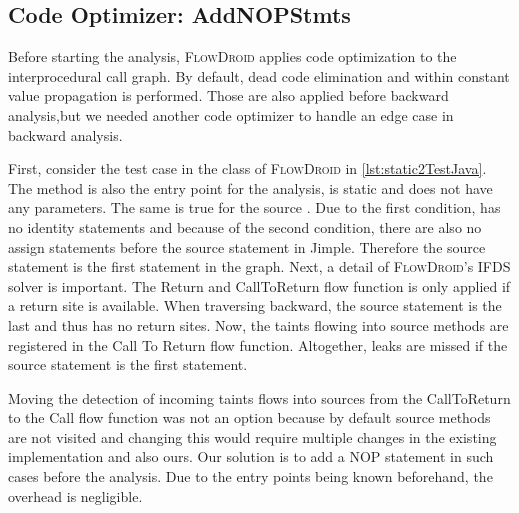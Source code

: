 \documentclass[../draft.tex]{subfiles}
\begin{document}
    \subsection{Code Optimizer: AddNOPStmts}
    Before starting the analysis, \textsc{FlowDroid} applies code optimization to the interprocedural call graph. 
    By default, dead code elimination and within constant value propagation is performed. 
    Those are also applied before backward analysis,but we needed another code optimizer to handle an edge case in backward analysis.

    First, consider the  test case in the  class of \textsc{FlowDroid} in \autoref{lst:static2TestJava}. 
    The method is also the entry point for the analysis, is static and does not have any parameters. 
    The same is true for the source . 
    Due to the first condition,  has no identity statements and because of the second condition, there are also no assign statements before the source statement in Jimple. 
    Therefore the source statement is the first statement in the graph. 
    Next, a detail of \textsc{FlowDroid}'s IFDS solver is important. 
    The Return and CallToReturn flow function is only applied if a return site is available.
    When traversing backward, the source statement is the last and thus has no return sites. 
    Now, the taints flowing into source methods are registered in the Call To Return flow function. 
    Altogether, leaks are missed if the source statement is the first statement.

    Moving the detection of incoming taints flows into sources from the CallToReturn to the Call flow function was not an option because by default source methods are not visited and changing this would require multiple changes in the existing implementation and also ours. 
    Our solution is to add a NOP statement in such cases before the analysis. 
    Due to the entry points being known beforehand, the overhead is negligible.
\end{document}
